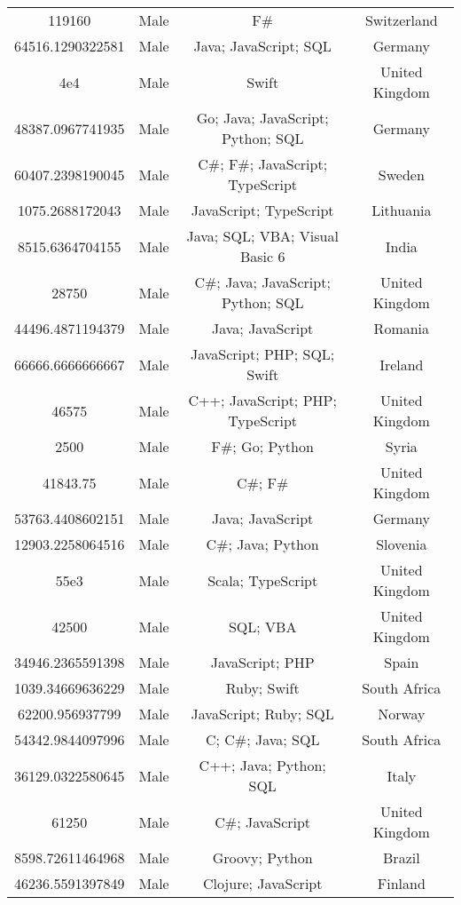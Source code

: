 \begin{center}
\begin{tabular}{ |c|c|c|c| }
119160  &  Male  &  F\#  &  Switzerland  \\ 
64516.1290322581  &  Male  &  Java; JavaScript; SQL  &  Germany  \\ 
4e4  &  Male  &  Swift  &  United Kingdom  \\ 
48387.0967741935  &  Male  &  Go; Java; JavaScript; Python; SQL  &  Germany  \\ 
60407.2398190045  &  Male  &  C\#; F\#; JavaScript; TypeScript  &  Sweden  \\ 
1075.2688172043  &  Male  &  JavaScript; TypeScript  &  Lithuania  \\ 
8515.6364704155  &  Male  &  Java; SQL; VBA; Visual Basic 6  &  India  \\ 
28750  &  Male  &  C\#; Java; JavaScript; Python; SQL  &  United Kingdom  \\ 
44496.4871194379  &  Male  &  Java; JavaScript  &  Romania  \\ 
66666.6666666667  &  Male  &  JavaScript; PHP; SQL; Swift  &  Ireland  \\ 
46575  &  Male  &  C++; JavaScript; PHP; TypeScript  &  United Kingdom  \\ 
2500  &  Male  &  F\#; Go; Python  &  Syria  \\ 
41843.75  &  Male  &  C\#; F\#  &  United Kingdom  \\ 
53763.4408602151  &  Male  &  Java; JavaScript  &  Germany  \\ 
12903.2258064516  &  Male  &  C\#; Java; Python  &  Slovenia  \\ 
55e3  &  Male  &  Scala; TypeScript  &  United Kingdom  \\ 
42500  &  Male  &  SQL; VBA  &  United Kingdom  \\ 
34946.2365591398  &  Male  &  JavaScript; PHP  &  Spain  \\ 
1039.34669636229  &  Male  &  Ruby; Swift  &  South Africa  \\ 
62200.956937799  &  Male  &  JavaScript; Ruby; SQL  &  Norway  \\ 
54342.9844097996  &  Male  &  C; C\#; Java; SQL  &  South Africa  \\ 
36129.0322580645  &  Male  &  C++; Java; Python; SQL  &  Italy  \\ 
61250  &  Male  &  C\#; JavaScript  &  United Kingdom  \\ 
8598.72611464968  &  Male  &  Groovy; Python  &  Brazil  \\ 
46236.5591397849  &  Male  &  Clojure; JavaScript  &  Finland  \\ 

\end{tabular}
\end{center}
